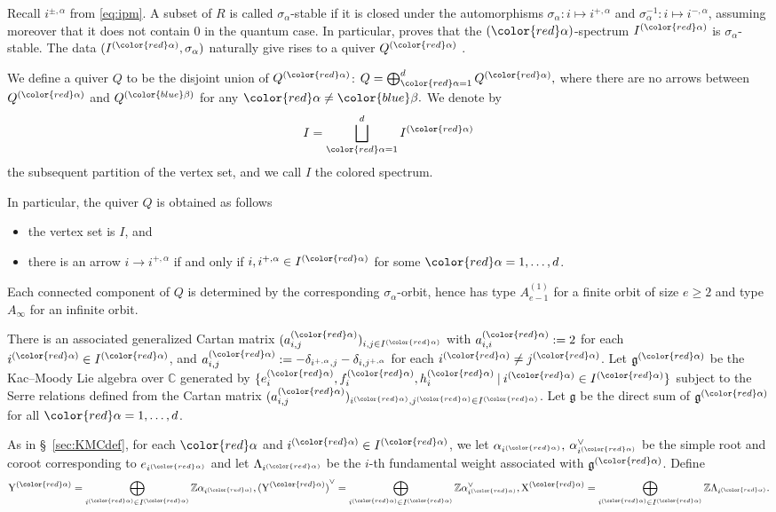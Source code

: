 \documentclass[12pt]{amsart}
\numberwithin{itemcounter}{subsection}
\theoremstyle{plain}
\theoremstyle{definition}
\theoremstyle{remark}
\numberwithin{equation}{section}
\def\bbZ{\mathbb{Z}}
\def\scrI{{I}}
\def\C{\operatorname{C}\nolimits}
\def\X{\operatorname{X}\nolimits}
\def\Y{\operatorname{Y}\nolimits}
\newcommand{\g}{\mathfrak{g}}
\def\C{{\mathbb C}}
\def\red#1{{\color{red} #1}}
\def\blue#1{{\color{blue} #1}}
\begin{document}
Recall $i^{\pm,\alpha}$ from \eqref{eq:ipm}. A subset of $R$ is called $\sigma_\alpha$-stable if it is closed under the automorphisms $\sigma_\alpha:i \mapsto i^{+,\alpha}$ and $\sigma_\alpha^{-1}:i\mapsto i^{-,\alpha}$, assuming moreover that it does not contain $0$ in the quantum case. In particular, \cite[Lemma 4.6]{BSW20a} proves that the $(\red{\alpha})$-spectrum $I^{(\red{\alpha})}$ is $\sigma_\alpha$-stable.
The data $(I^{(\red{\alpha})},\sigma_\alpha)$ naturally give rises to a quiver $Q^{(\red{\alpha})}$ .

We define a quiver $Q$ to be the disjoint union of $Q^{(\red{\alpha})}$:
$Q=\bigoplus_{\red{\alpha}=1}^d Q^{(\red{\alpha})},$
where there are no arrows between $Q^{(\red{\alpha})}$ and $Q^{(\blue{\beta})}$ for any $\red{\alpha}\neq \blue{\beta}.$ We denote by $$I=\bigsqcup_{\red{\alpha}=1}^{d}I^{(\red{\alpha})}$$ the
subsequent partition of the vertex set, and we call $I$ the colored spectrum.

In particular, the quiver $Q$ is obtained as follows
\begin{itemize}[leftmargin=8mm]
	\item  the vertex set is $I$, and
	\item there is an arrow $i\to i^{+,\alpha}$ if and only if $i, i^{+,\alpha}\in I^{(\red{\alpha})}$ for some $\red{\alpha}=1,\ldots,d$.
 \end{itemize}
Each connected component of $Q$ is determined by the corresponding $\sigma_\alpha$-orbit, hence has type $A_{e-1}^{(1)}$ for a finite orbit of size $e\ge2$ and type $A_\infty$ for an infinite orbit.

There is an associated generalized Cartan matrix
$(a^{(\red{\alpha})}_{i,j})_{i,j \in I^{(\red{\alpha})}}$ with $a^{(\red{\alpha})}_{i,i} := 2$ for each $i^{(\red{\alpha})} \in I^{(\red{\alpha})}$, and
$a^{(\red{\alpha})}_{i,j}:=-\delta_{i^{+,\alpha},j}-\delta_{i,j^{+,\alpha}}$
for each $i^{(\red{\alpha})} \neq j^{(\red{\alpha})}$.
Let $\g^{(\red{\alpha})}$ be the Kac--Moody Lie algebra over $\C$
generated by $\{e^{(\red{\alpha})}_i, f^{(\red{\alpha})}_i, h^{(\red{\alpha})}_i\:|\:i^{(\red{\alpha})} \in I^{(\red{\alpha})}\}$ subject to the Serre
relations defined from
the Cartan matrix $(a^{(\red{\alpha})}_{i,j})_{i^{(\red{\alpha})}, j^{(\red{\alpha})} \in I^{(\red{\alpha})}}$.
Let $\g$ be the direct sum of $\g^{(\red{\alpha})}$ for all $\red{\alpha}=1,\ldots,d$.

As in \S~\ref{sec:KMCdef}, for each $\red{\alpha}$ and $i^{(\red{\alpha})}\in\scrI^{(\red{\alpha})}$, we let $\alpha_{i^{(\red{\alpha})}},$ $\alpha_{i^{(\red{\alpha})}}^\vee$ be the simple root and coroot
corresponding to $e_{i^{(\red{\alpha})}}$ and let $\Lambda_{i^{(\red{\alpha})}}$ be the $i$-th fundamental weight associated with $\mathfrak{g}^{(\red{\alpha})}$. Define
$$\Y^{(\red{\alpha})}=\bigoplus\limits_{i^{(\red{\alpha})}\in \scrI^{(\red{\alpha})}} \bbZ \alpha_{i^{(\red{\alpha})}}, {(\Y^{(\red{\alpha})})}^\vee = \bigoplus\limits_{i^{(\red{\alpha})}\in \scrI^{(\red{\alpha})}} \bbZ \alpha_{i^{(\red{\alpha})}}^\vee,
\X^{(\red{\alpha})}=\bigoplus\limits_{i^{(\red{\alpha})}\in \scrI^{(\red{\alpha})}}\bbZ \Lambda_{i^{(\red{\alpha})}}.$$
\end{document}
